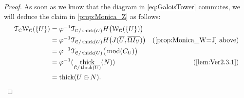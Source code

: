 \documentclass[10pt,twoside, a4paper,reqno]{amsart}
\DeclareMathOperator{\mods}{mod}
\DeclareMathOperator{\thick}{thick}
\newcommand{\calC}{\mathcal{C}}
\newcommand{\calT}{\mathcal{T}}
\newcommand{\calW}{\mathcal{W}}
\theoremstyle{definition}
\begin{document}
\begin{proof}
      As soon as we know that the diagram in \eqref{eq:GaloisTower} commutes, we will deduce the claim in \eqref{prop:Monica_Z} as follows:{      \begin{align*}
     	 \calT_{\calC}\calW_{\calC}(\{U\}) &=  \varphi^{-1}\calT_{\calC/\thick(U)}H \big(\calW_{\calC}(\{U\})\big) \\
	  &=  \varphi^{-1}\calT_{\calC/\thick(U)}H \big(J(\overline{U},\overline{\Omega I_U}) \big) & \text{(\eqref{prop:Monica_W=J} above)} \\
	  &= \varphi^{-1}\calT_{\calC/\thick(U)}\big( \mods(C_U) \big) \\
	  &=  \varphi^{-1}(\thick_{\calC/\thick(U)}(N)) & \text{(\Cref{lem:Ver2.3.1})} \\
	  &= \thick(U\oplus N).
      \end{align*}
      }
      

\end{proof}
\end{document}
